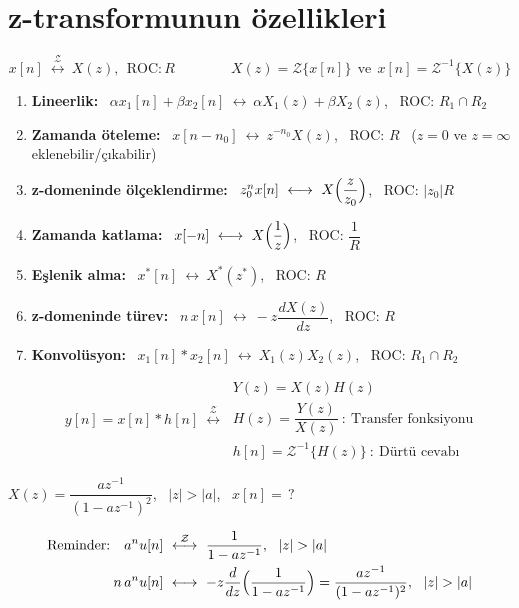\documentclass[11pt,a4paper]{article}
\begin{document}
\section{z-transformunun özellikleri}
\[
  x[n]\ \overset{\mathcal{Z}}{\longleftrightarrow}\ X(z),\ \ \text{ROC}: R
  \qquad\qquad
  X(z)=\mathcal{Z}\{x[n]\}\ \ \text{ve}\ \ x[n]=\mathcal{Z}^{-1}\{X(z)\}
\]
\begin{enumerate}[label=\arabic*)]
  \item \textbf{Lineerlik:} \ $\alpha x_1[n]+\beta x_2[n]\ \longleftrightarrow\ \alpha X_1(z)+\beta X_2(z)$, \ ROC: $R_1\cap R_2$
  \item \textbf{Zamanda öteleme:} \ $x[n-n_0]\ \longleftrightarrow\ z^{-n_0}X(z)$, \ ROC: $R$ \ ($z=0$ ve $z=\infty$ eklenebilir/çıkabilir)
  \item \textbf{z-domeninde ölçeklendirme:} \ $z_0^nx[n]\ \longleftrightarrow\ X\Bigl(\dfrac{z}{z_0}\Bigr)$, \ ROC: $|z_0|R$
  \item \textbf{Zamanda katlama:} \ $x[-n]\ \longleftrightarrow\ X\Bigl(\dfrac1z\Bigr)$, \ ROC: $\dfrac1R$
  \item \textbf{Eşlenik alma:} \ $x^*[n]\ \longleftrightarrow\ X^*(z^*)$, \ ROC: $R$
  \item \textbf{z-domeninde türev:} \ $n\,x[n]\ \longleftrightarrow\ -z\dfrac{dX(z)}{dz}$, \ ROC: $R$
  \item \textbf{Konvolüsyon:} \ $x_1[n]*x_2[n]\ \longleftrightarrow\ X_1(z)X_2(z)$, \ ROC: $R_1\cap R_2$
    \begin{center}
    \end{center}
    \[
      y[n]=x[n]*h[n]\ \overset{\mathcal{Z}}{\longleftrightarrow}\
      \begin{array}{l}
        Y(z)=X(z)H(z)\\[1mm]
        H(z)=\dfrac{Y(z)}{X(z)}\ :\ \text{Transfer fonksiyonu}\\[3mm]
        h[n]=\mathcal{Z}^{-1}\{H(z)\}\ :\ \text{Dürtü cevabı}
      \end{array}
    \]
\end{enumerate}

\begin{ornek}[]
  $X(z)=\dfrac{az^{-1}}{(1-az^{-1})^2}$, \ $|z|>|a|$, \ $x[n]=\,?$
\end{ornek}
\begin{align*}
  \text{Reminder:}\quad a^nu[n]\ &\overset{\mathcal{Z}}{\longleftrightarrow}\ \frac{1}{1-az^{-1}},\ \ |z|>|a|\\
  n\,a^nu[n]\ &\longleftrightarrow\ -z\frac{d}{dz}\Bigl(\frac{1}{1-az^{-1}}\Bigr)=\frac{az^{-1}}{(1-az^{-1})^2},\ \ |z|>|a|
\end{align*}
\end{document}
